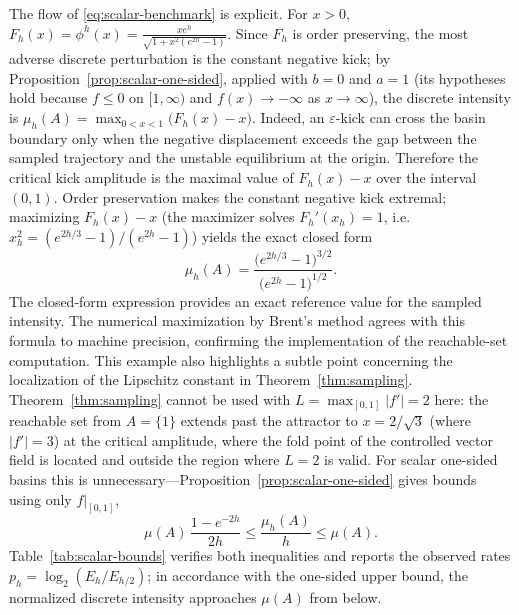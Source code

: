 \documentclass[pdflatex,sn-mathphys-num]{sn-jnl}
\numberwithin{equation}{section}
\theoremstyle{thmstyleone}%
\theoremstyle{definition}
\theoremstyle{remark}
\begin{document}
The flow of \eqref{eq:scalar-benchmark} is explicit. For \(x>0\), $F_h(x)=\phi^h(x) = \frac{xe^h}{\sqrt{1+x^2(e^{2h}-1)}}$. Since \(F_h\) is order preserving, the most adverse discrete perturbation is the constant negative kick; by Proposition~\ref{prop:scalar-one-sided}, applied with \(b=0\) and
\(a=1\) (its hypotheses hold because \(f\leq0\) on \([1,\infty)\) and \(f(x)\to-\infty\) as \(x\to\infty\)), the discrete intensity is $\mu_h(A) = \max_{0<x<1}\bigl(F_h(x)-x\bigr)$. Indeed, an $\varepsilon$-kick can cross the basin boundary only when the negative displacement exceeds the gap between the sampled trajectory and the unstable equilibrium at the origin. Therefore the critical kick amplitude is the maximal value of $F_h(x)-x$ over the interval $(0,1)$. Order preservation makes the constant negative kick extremal; maximizing $F_h(x)-x$ (the maximizer solves $F_h'(x_h)=1$, i.e. $x_h^2=(e^{2h/3}-1)/(e^{2h}-1)$) yields the exact closed form
\begin{equation}
    \mu_h(A)
    =
    \frac{
        \bigl(e^{2h/3}-1\bigr)^{3/2}
    }{
        \bigl(e^{2h}-1\bigr)^{1/2}
    }.
    \label{eq:scalar-exact-discrete-intensity}
\end{equation}
The closed-form expression provides an exact reference value for the sampled intensity. The numerical maximization by Brent's method agrees with this formula to machine precision, confirming the implementation of the reachable-set computation. 
This example also highlights a subtle point concerning the localization of the Lipschitz constant in Theorem~\ref{thm:sampling}.
Theorem~\ref{thm:sampling} cannot be used with $L=\max_{[0,1]}|f'|=2$
here: the reachable set from $A=\{1\}$ extends past the attractor to $x=2/\sqrt3$ (where $|f'|=3$) at the critical amplitude, where the fold point of the controlled vector field is located and outside the region where $L=2$ is valid. For scalar one-sided basins this is unnecessary---Proposition~\ref{prop:scalar-one-sided} gives bounds using only $f|_{[0,1]}$,
\begin{equation}
    \mu(A)\,\frac{1-e^{-2h}}{2h}
    \leq
    \frac{\mu_h(A)}h
    \leq
    \mu(A).
    \label{eq:scalar-theoretical-bounds}
\end{equation}
Table~\ref{tab:scalar-bounds} verifies both inequalities and reports the observed rates $p_h=\log_2(E_h/E_{h/2})$; in accordance with the one-sided upper bound, the normalized discrete intensity approaches \(\mu(A)\) from below.
\end{document}

